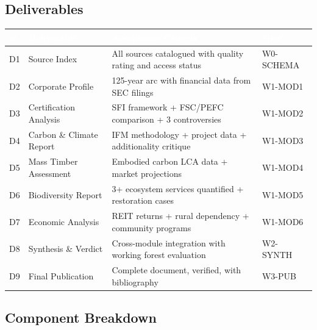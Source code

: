 \documentclass[11pt,letterpaper]{article}
\newcommand{\tableheader}[1]{\textbf{\sffamily\textcolor{white}{#1}}}
\begin{document}
\subsection{Deliverables}

\begin{center}
\begin{tabularx}{\textwidth}{C{0.8cm}L{3.5cm}XC{2cm}}
\toprule
{}
\tableheader{\#} & \tableheader{Deliverable} & \tableheader{Acceptance Criteria} & \tableheader{Spec} \\
\midrule
D1 & Source Index & All sources catalogued with quality rating and access status & W0-SCHEMA \\
D2 & Corporate Profile & 125-year arc with financial data from SEC filings & W1-MOD1 \\
D3 & Certification Analysis & SFI framework + FSC/PEFC comparison + 3 controversies & W1-MOD2 \\
D4 & Carbon \& Climate Report & IFM methodology + project data + additionality critique & W1-MOD3 \\
D5 & Mass Timber Assessment & Embodied carbon LCA data + market projections & W1-MOD4 \\
D6 & Biodiversity Report & 3+ ecosystem services quantified + restoration cases & W1-MOD5 \\
D7 & Economic Analysis & REIT returns + rural dependency + community programs & W1-MOD6 \\
D8 & Synthesis \& Verdict & Cross-module integration with working forest evaluation & W2-SYNTH \\
D9 & Final Publication & Complete document, verified, with bibliography & W3-PUB \\
\bottomrule
\end{tabularx}
\end{center}

\subsection{Component Breakdown}
\end{document}
